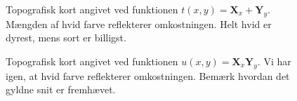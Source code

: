 {\begin{figure}[h]
    \setlength\fboxsep{0pt}
    \setlength\fboxrule{0.5pt}
    \begin{center}
    \end{center}
    \caption[]{Topografisk kort angivet ved funktionen $t(x, y) =
    \mathbf{X}_x + \mathbf{Y}_y$. Mængden af hvid farve reflekterer
    omkostningen. Helt hvid er dyrest, mens sort er billigst.}
    \label{topography_plus}
\end{figure}

\begin{figure}[h]
    \setlength\fboxsep{0pt}
    \setlength\fboxrule{0.5pt}
    \begin{center}
    \end{center}
    \caption[]{Topografisk kort angivet ved funktionen $u(x, y) =
    \mathbf{X}_x\mathbf{Y}_y$. Vi har igen, at hvid farve reflekterer
    omkostningen. Bemærk hvordan det gyldne snit er fremhævet.}
    \label{topography_times}
\end{figure}

}
